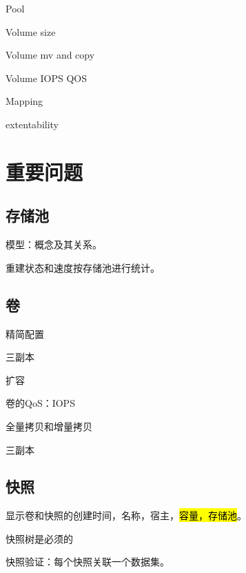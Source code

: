 \begin{enumbox}
\item Pool
\item Volume size
\item Volume mv and copy
\item Volume IOPS QOS
\item Mapping
\item extentability
\end{enumbox}

\section{重要问题}

\subsection{存储池}

模型：概念及其关系。

重建状态和速度按存储池进行统计。

\subsection{卷}

\begin{enumbox}
\item 精简配置
\item 三副本
\item 扩容
\item 卷的QoS：IOPS
\item 全量拷贝和增量拷贝
\end{enumbox}

三副本 

\subsection{快照}

\begin{enumbox}
\item 显示卷和快照的创建时间，名称，宿主，\hl{容量，存储池}。
\item 快照树是必须的
\item 快照验证：每个快照关联一个数据集。
\end{enumbox}

